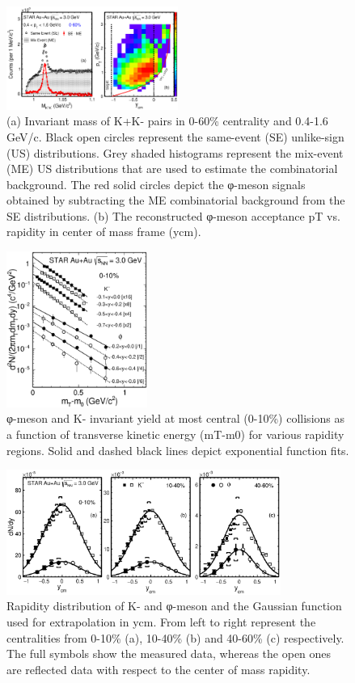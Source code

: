 \documentclass[%
 reprint,	
showpacs,
 amsmath,amssymb,
 aps,
 prc,
]{revtex4-1}
\begin{document}
\begin{figure}
\centering
\includegraphics[width=0.50\textwidth]{fig/fig1_signal.eps}
  \caption{(a) Invariant mass of K+K- pairs in 0-60\% centrality and 0.4-1.6 GeV/c. Black open circles represent the same-event (SE) unlike-sign (US) distributions. Grey shaded histograms represent the mix-event (ME) US distributions that are used to estimate the combinatorial background. The red solid circles depict the φ-meson signals obtained by subtracting the ME combinatorial background from the SE distributions. (b) The reconstructed φ-meson acceptance pT vs. rapidity in center of mass frame (ycm).}
\label{fig:phiSignal} 
\end{figure}

\begin{figure}
\centering
\includegraphics[width=0.41\textwidth]{fig/fig2_h_mT_spectra_phiMeson.eps}
  \caption{ φ-meson and K- invariant yield at most central (0-10\%) collisions as a function of transverse kinetic energy (mT-m0) for various rapidity regions. Solid and dashed black lines depict exponential function fits.}
\label{fig:phimTSpectra} 
\end{figure}

\begin{figure}
\centering
\includegraphics[width=0.8\textwidth]{fig/fig3_dndy.eps}
  \caption{ Rapidity distribution of K- and φ-meson and the Gaussian function used for extrapolation in ycm. From left to right represent the centralities from 0-10\% (a), 10-40\% (b) and 40-60\% (c) respectively. The full symbols show the measured data, whereas the open ones are reflected data with respect to the center of mass rapidity.}
\label{fig:phiYSpectra} 
\end{figure}
\end{document}
